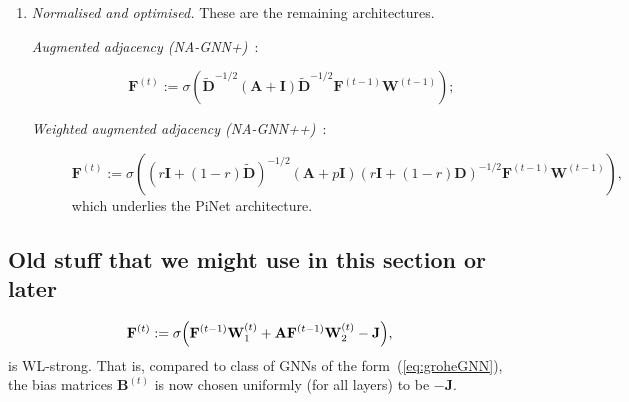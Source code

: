 \begin{enumerate}
\item \emph{Normalised and optimised.} These are the remaining architectures.
\begin{description}
\item[\textit{Augmented adjacency (NA-GNN+)}~\cite{kipf-loose}:] %
$$
\mathbf{F}^{(t)}:=\sigma\left(\tilde{\mathbf{D}}^{-1/2}(\mathbf{A}+\mathbf{I})\tilde{\mathbf{D}}^{-1/2}\mathbf{F}^{(t-1)}\mathbf{W}^{(t-1)}\right);
$$
\item[\textit{Weighted augmented adjacency (NA-GNN++)}~\cite{DBLP:journals/corr/abs-1905-03046}:]
$$\mathbf{F}^{(t)}:=\sigma\left((r\mathbf{I}+(1-r)\tilde{\mathbf{D}})^{-1/2}(\mathbf{A}+p\mathbf{I})(r\mathbf{I}+(1-r)\mathbf{D})^{-1/2}\mathbf{F}^{(t-1)}\mathbf{W}^{(t-1)}\right),
$$
which underlies the PiNet architecture.
\end{description}
\end{enumerate}

\subsection{Old stuff that we might use in this section or later}

\begin{equation}
\mathbf{F}^{(t)}:=\sigma\Bigl(\mathbf{F}^{(t-1)}\mathbf{W}_1^{(t)}+ \mathbf{A}\mathbf{F}^{(t-1)}\mathbf{W}_2^{(t)} - \mathbf{J}\Bigr), \label{eq:groheGNNwithJ}
\end{equation}
is WL-strong. That is, compared to class of GNNs of the form~(\ref{eq:groheGNN}), the bias matrices $\mathbf{B}^{(t)}$ is now chosen uniformly (for all layers) to be $-\mathbf{J}$.


